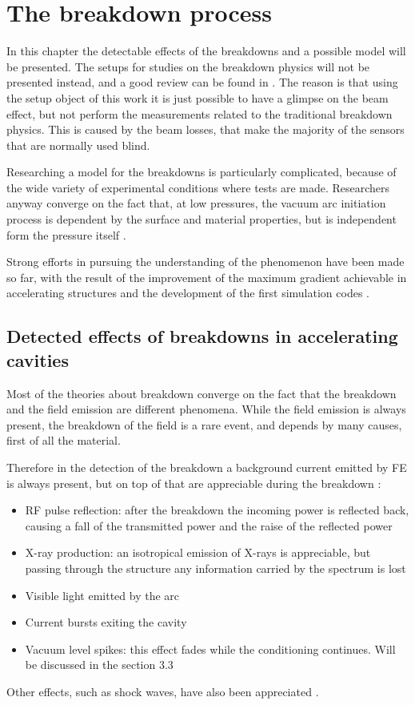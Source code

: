 \chapter[The breakdown process]{The breakdown process}

In this chapter the detectable effects of the breakdowns and a possible model will be presented. The setups for studies on the breakdown physics will not be presented instead, and a good review can be found in \cite{Kovermann:1330346}. The reason is that using the setup object of this work it is just possible to have a glimpse on the beam effect, but not perform the measurements related to the traditional breakdown physics. This is caused by the beam losses, that make the majority of the sensors that are normally used blind.

Researching a model for the breakdowns is particularly complicated, because of the wide variety of experimental conditions where tests are made. Researchers anyway converge on the fact that, at low pressures, the vacuum arc initiation process is dependent by the surface and material properties, but is independent form the pressure itself \cite{alpert:triggers}.

Strong efforts in pursuing the understanding of the phenomenon have been made so far, with the result of the improvement of the maximum gradient achievable in accelerating structures and the development of the first simulation codes \cite{Insepov:1373092}.



\section[Detected effects of breakdowns in accelerating cavities]{Detected effects of breakdowns in accelerating cavities}

Most of the theories about breakdown converge on the fact that the breakdown and the field emission are different phenomena. While the field emission is always present, the breakdown of the field is a rare event, and depends by many causes, first of all the material.

Therefore in the detection of the breakdown a background current emitted by FE is always present, but on top of that are appreciable during the breakdown \cite{Wuensch:583549}:

\begin{itemize}
\item RF pulse reflection: after the breakdown the incoming power is reflected back, causing a fall of the transmitted power and the raise of the reflected power 
\item X-ray production: an isotropical emission of X-rays is appreciable, but passing through the structure any information carried by the spectrum is lost
\item Visible light emitted by the arc
\item Current bursts exiting the cavity
\item Vacuum level spikes: this effect fades while the conditioning continues. Will be discussed in the section 3.3 
\end{itemize}
Other effects, such as shock waves, have also been appreciated \cite{Rajamaki:2143815}. 

